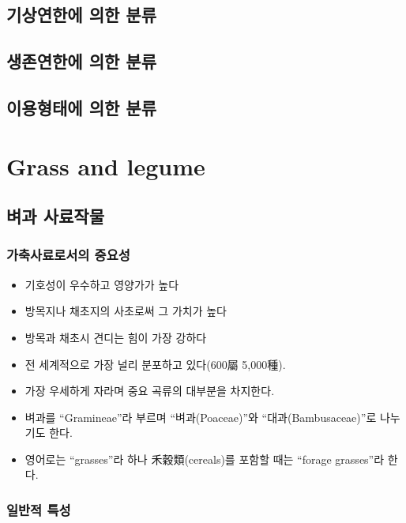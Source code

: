 \documentclass[]{book}
\providecommand{\tightlist}{%
  \setlength{\itemsep}{0pt}\setlength{\parskip}{0pt}}
\begin{document}
\section{기상연한에 의한 분류}\label{--}

\section{생존연한에 의한 분류}\label{--}

\section{이용형태에 의한 분류}\label{--}

\chapter{Grass and legume}\label{legumeandgrass}

\section{벼과 사료작물}\label{--1}

\subsection{가축사료로서의 중요성}\label{-}

\begin{itemize}
\tightlist
\item
  기호성이 우수하고 영양가가 높다
\item
  방목지나 채초지의 사초로써 그 가치가 높다
\item
  방목과 채초시 견디는 힘이 가장 강하다
\item
  전 세계적으로 가장 널리 분포하고 있다(600屬 5,000種).
\item
  가장 우세하게 자라며 중요 곡류의 대부분을 차지한다.
\item
  벼과를 ``Gramineae''라 부르며 ``벼과(Poaceae)''와
  ``대과(Bambusaceae)''로 나누기도 한다.
\item
  영어로는 ``grasses''라 하나 禾穀類(cereals)를 포함할 때는 ``forage
  grasses''라 한다.
\end{itemize}

\subsection{일반적 특성}\label{-}
\end{document}
